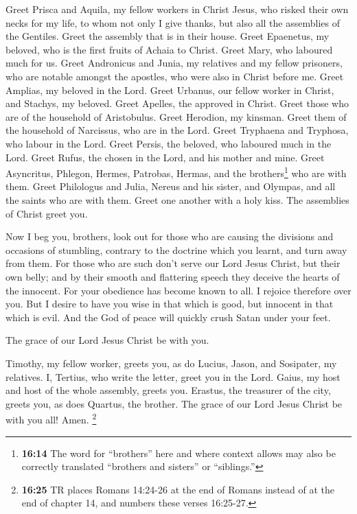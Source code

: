  Greet Prisca and Aquila, my fellow workers in Christ
Jesus,  who risked their own necks for my life, to whom
not only I give thanks, but also all the assemblies of the Gentiles.
 Greet the assembly that is in their house. Greet
Epaenetus, my beloved, who is the first fruits of Achaia to Christ.
 Greet Mary, who laboured much for us. 
Greet Andronicus and Junia, my relatives and my fellow prisoners, who
are notable amongst the apostles, who were also in Christ before me.
 Greet Amplias, my beloved in the Lord. 
Greet Urbanus, our fellow worker in Christ, and Stachys, my beloved.
 Greet Apelles, the approved in Christ. Greet those who
are of the household of Aristobulus.  Greet Herodion, my
kinsman. Greet them of the household of Narcissus, who are in the Lord.
 Greet Tryphaena and Tryphosa, who labour in the Lord.
Greet Persis, the beloved, who laboured much in the Lord.
 Greet Rufus, the chosen in the Lord, and his mother and
mine.  Greet Asyncritus, Phlegon, Hermes, Patrobas,
Hermas, and the brothers\footnote{\textbf{16:14} The word for
  ``brothers'' here and where context allows may also be correctly
  translated ``brothers and sisters'' or ``siblings.''} who are with
them.  Greet Philologus and Julia, Nereus and his sister,
and Olympas, and all the saints who are with them.  Greet
one another with a holy kiss. The assemblies of Christ greet you.

 Now I beg you, brothers, look out for those who are
causing the divisions and occasions of stumbling, contrary to the
doctrine which you learnt, and turn away from them.  For
those who are such don't serve our Lord Jesus Christ, but their own
belly; and by their smooth and flattering speech they deceive the hearts
of the innocent.  For your obedience has become known to
all. I rejoice therefore over you. But I desire to have you wise in that
which is good, but innocent in that which is evil.  And
the God of peace will quickly crush Satan under your feet.

The grace of our Lord Jesus Christ be with you.

 Timothy, my fellow worker, greets you, as do Lucius,
Jason, and Sosipater, my relatives.  I, Tertius, who
write the letter, greet you in the Lord.  Gaius, my host
and host of the whole assembly, greets you. Erastus, the treasurer of
the city, greets you, as does Quartus, the brother.  The
grace of our Lord Jesus Christ be with you all! Amen. 
\footnote{\textbf{16:25} TR places Romans 14:24-26 at the end of Romans
  instead of at the end of chapter 14, and numbers these verses
  16:25-27.}
